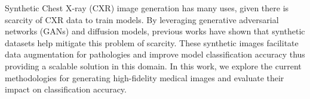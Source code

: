 Synthetic Chest X-ray (CXR) image generation has many uses, given there is scarcity
of CXR data to train models. By leveraging generative adversarial networks (GANs)
and diffusion models, previous works \cite{Nath2013} have shown that synthetic datasets
help mitigate this problem of scarcity. These synthetic images facilitate data
augmentation for pathologies and improve model classification accuracy thus
providing a scalable solution in this domain. In this work, we explore the
current methodologies for generating high-fidelity medical images and evaluate
their impact on classification accuracy.
